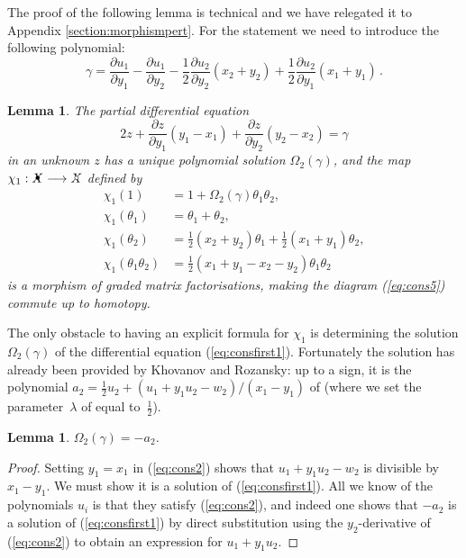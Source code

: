 \documentclass{compositio}
\newtheorem{lemma}[theorem]{Lemma}
\theoremstyle{definition}
\numberwithin{equation}{section}
\begin{document}
The proof of the following lemma is technical and we have relegated it to Appendix \ref{section:morphismpert}. For the statement we need to introduce the following polynomial:
\[
\gamma = \frac{\partial u_1}{\partial y_1} - \frac{\partial u_1}{\partial y_2} - \frac{1}{2} \frac{\partial u_2}{\partial y_2}(x_2 + y_2) + \frac{1}{2} \frac{\partial u_2}{\partial y_1}(x_1 + y_1) \, .
\]
\begin{lemma}\label{lemma:consfirst} The partial differential equation 
\begin{equation}\label{eq:consfirst1}
2 z + \frac{\partial z}{\partial y_1} (y_1 - x_1) + \frac{\partial z}{\partial y_2}(y_2 - x_2) = \gamma
\end{equation}
in an unknown $z$ has a unique polynomial solution $\Omega_2(\gamma)$, and the map $\chi_1: \Xbul \lto \Xcirc$ defined by
\begin{align*}
\chi_1(1) &= 1 + \Omega_2( \gamma )\theta_1 \theta_2,\\
\chi_1(\theta_1) &= \theta_1 + \theta_2,\\
\chi_1(\theta_2) &= \frac{1}{2}(x_2 + y_2)\theta_1 + \frac{1}{2}(x_1 + y_1)\theta_2,\\
\chi_1(\theta_1\theta_2) &= \frac{1}{2}(x_1 + y_1 - x_2 - y_2) \theta_1\theta_2
\end{align*}
is a morphism of graded matrix factorisations, making the diagram (\ref{eq:cons5}) commute up to homotopy.
\end{lemma}

The only obstacle to having an explicit formula for $\chi_1$ is determining the solution $\Omega_2(\gamma)$ of the differential equation (\ref{eq:consfirst1}). Fortunately the solution has already been provided by Khovanov and Rozansky: up to a sign, it is the polynomial $a_2 = \frac{1}{2}u_2 + (u_1 + y_1 u_2 - w_2)/(x_1-y_1)$ of \cite[p.51]{kr0401268} (where we set the parameter~$\lambda$ of \cite{kr0401268} equal to~$\frac{1}{2}$).

\begin{lemma} $\Omega_2(\gamma) = -a_2$.
\end{lemma}
\begin{proof}
Setting $y_1 = x_1$ in (\ref{eq:cons2}) shows that $u_1 + y_1 u_2 - w_2$ is divisible by $x_1 - y_1$. We must show it is a solution of (\ref{eq:consfirst1}). All we know of the polynomials $u_i$ is that they satisfy (\ref{eq:cons2}), and indeed one shows that $-a_2$ is a solution of (\ref{eq:consfirst1}) by direct substitution using the $y_2$-derivative of (\ref{eq:cons2}) to obtain an expression for $u_1 + y_1 u_2$.
\end{proof}
\end{document}
